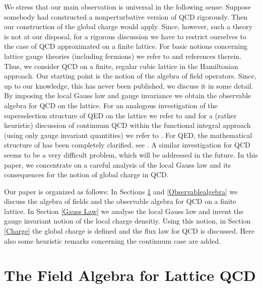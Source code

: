 \documentclass[a4paper,12pt]{article}
\begin{document}
We stress that our main observation is universal in the following
sense: Suppose somebody had constructed a nonperturbative version
of QCD rigorously. Then our construction of the global charge
would apply. Since, however, such a theory is not at our disposal,
for a rigorous discussion we have to restrict ourselves to the
case of QCD approximated on a finite lattice. For basic notions
concerning lattice gauge theories (including fermions) we refer to
\cite{Seiler} and references therein. Thus, we consider QCD  on a
finite, regular cubic lattice in the Hamiltonian approach. Our
starting point is the notion of the algebra of field operators.
Since, up to our knowledge, this has never been published, we
discuss it in some detail. By imposing the local Gauss law and
gauge invariance we obtain the observable algebra \coordHE{} for QCD on the lattice. For an analogous
investigation of the superselection structure of QED on the
lattice we refer to \cite{KRT} and for a (rather heuristic)
discussion of continuum QCD within the functional integral
approach (using only gauge invariant quantities) we refer to
\cite{KRR}. For QED, the mathematical structure of \coordHE{} has been completely clarified, see \cite{KRS}. A
similar investigation for QCD seems to be a very difficult
problem, which will be addressed in the future. In this paper, we
concentrate on a careful analysis of the local Gauss law and its
consequences for the notion of global charge in QCD.

Our paper is organized as follows: In Sections \ref{Algebra} and
\ref{Observablealgebra} we discuss the algebra of fields and the
observable algebra for QCD on a finite lattice. In Section
\ref{Gauss Law} we analyse the local Gauss law and invent the
gauge invariant notion of the local charge densitiy. Using this
notion, in Section \ref{Charge} the global charge is defined and
the flux law for QCD is discussed. Here also some heuristic
remarks concerning the continuum case are added.





\setcounter{equation}{0}
\section{The Field Algebra for Lattice QCD}
\label{Algebra}
\end{document}
